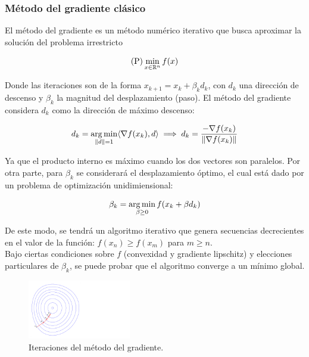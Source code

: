 \subsubsection{Método del gradiente clásico}

El método del gradiente es un método numérico iterativo que busca aproximar la solución del problema irrestricto

\begin{equation*}
	\text{(P)} \min_{x\in \mathbb{R}^n} f(x)
\end{equation*}

Donde las iteraciones son de la forma $x_{k+1} = x_k + \beta_k d_k$, con $d_k$ una dirección de descenso y $\beta_k$ la magnitud del desplazamiento (paso). El método del gradiente considera $d_k$ como la dirección de máximo descenso:

\begin{equation*}
	d_k = \operatorname*{arg\,min}_{\left\lVert d\right\rVert = 1} \langle\nabla f(x_k),d\rangle \implies d_k = \frac{-\nabla f(x_k)}{\left\lVert\nabla f(x_k)\right\rVert}
\end{equation*}

Ya que el producto interno es máximo cuando los dos vectores son paralelos. Por otra parte, para $\beta_k$ se considerará el desplazamiento óptimo, el cual está dado por un problema de optimización unidimiensional:

\begin{equation*}
	\beta_k = \operatorname*{arg\,min}_{\beta\geq 0} f(x_k + \beta d_k) 
\end{equation*}

De este modo, se tendrá un algoritmo iterativo que genera secuencias decrecientes en el valor de la función: $f(x_n)\geq f(x_m)$ para $m\geq n$.\\

Bajo ciertas condiciones sobre $f$ (convexidad y gradiente lipschitz) y elecciones particulares de $\beta_k$, se puede probar que el algoritmo converge a un mínimo global. 

\begin{figure}[H]
  \centering
  \includegraphics[width=0.4\textwidth]{img/anexos_gd}
  \caption{Iteraciones del método del gradiente.}
\end{figure}

